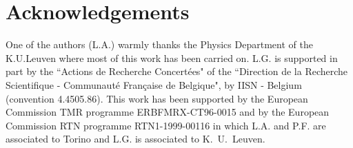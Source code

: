 \documentclass[a4paper,12pt]{article}
\begin{document}
\section*{Acknowledgements}
One of the authors (L.A.) warmly thanks the Physics Department of
the K.U.Leuven where most of this work has been carried on. L.G.
is supported in part by the ``Actions de Recherche Concert{\'e}es"
of the ``Direction de la Recherche Scientifique - Communaut{\'e}
Fran{\c c}aise de Belgique", by IISN - Belgium (convention
4.4505.86). This work has been supported by the European
Commission TMR programme ERBFMRX-CT96-0015 and by the European
Commission RTN programme RTN1-1999-00116 in which L.A. and P.F.
are associated to Torino and L.G. is associated to K.\ U.\ Leuven.
\end{document}
